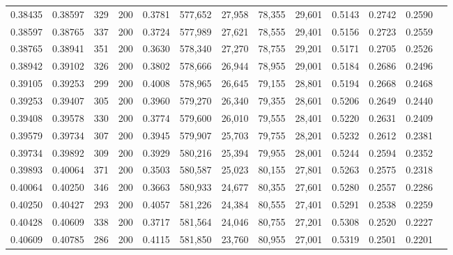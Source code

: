 \begin{tabular}{rrrrrrrrrrrrr}
0.38435 & 0.38597 &    329 & 200 &                                     0.3781 & 577,652 &  27,958 &  78,355 &  29,601 & 0.5143 & 0.2742 & 0.2590 \\
0.38597 & 0.38765 &    337 & 200 &                                     0.3724 & 577,989 &  27,621 &  78,555 &  29,401 & 0.5156 & 0.2723 & 0.2559 \\
0.38765 & 0.38941 &    351 & 200 &                                     0.3630 & 578,340 &  27,270 &  78,755 &  29,201 & 0.5171 & 0.2705 & 0.2526 \\
0.38942 & 0.39102 &    326 & 200 &                                     0.3802 & 578,666 &  26,944 &  78,955 &  29,001 & 0.5184 & 0.2686 & 0.2496 \\
0.39105 & 0.39253 &    299 & 200 &                                     0.4008 & 578,965 &  26,645 &  79,155 &  28,801 & 0.5194 & 0.2668 & 0.2468 \\
0.39253 & 0.39407 &    305 & 200 &                                     0.3960 & 579,270 &  26,340 &  79,355 &  28,601 & 0.5206 & 0.2649 & 0.2440 \\
0.39408 & 0.39578 &    330 & 200 &                                     0.3774 & 579,600 &  26,010 &  79,555 &  28,401 & 0.5220 & 0.2631 & 0.2409 \\
0.39579 & 0.39734 &    307 & 200 &                                     0.3945 & 579,907 &  25,703 &  79,755 &  28,201 & 0.5232 & 0.2612 & 0.2381 \\
0.39734 & 0.39892 &    309 & 200 &                                     0.3929 & 580,216 &  25,394 &  79,955 &  28,001 & 0.5244 & 0.2594 & 0.2352 \\
0.39893 & 0.40064 &    371 & 200 &                                     0.3503 & 580,587 &  25,023 &  80,155 &  27,801 & 0.5263 & 0.2575 & 0.2318 \\
0.40064 & 0.40250 &    346 & 200 &                                     0.3663 & 580,933 &  24,677 &  80,355 &  27,601 & 0.5280 & 0.2557 & 0.2286 \\
0.40250 & 0.40427 &    293 & 200 &                                     0.4057 & 581,226 &  24,384 &  80,555 &  27,401 & 0.5291 & 0.2538 & 0.2259 \\
0.40428 & 0.40609 &    338 & 200 &                                     0.3717 & 581,564 &  24,046 &  80,755 &  27,201 & 0.5308 & 0.2520 & 0.2227 \\
0.40609 & 0.40785 &    286 & 200 &                                     0.4115 & 581,850 &  23,760 &  80,955 &  27,001 & 0.5319 & 0.2501 & 0.2201 \\

\end{tabular}
